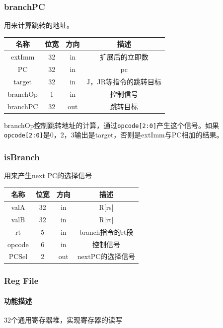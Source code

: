 \documentclass[UTF8]{ctexart}
\begin{document}
\subsubsection{branchPC }
用来计算跳转的地址。
\begin{table}[h]
    \centering
    \begin{tabular}{|c|c|c|c|}
        \hline  
        名称 & 位宽 & 方向 & 描述 \\ \hline 
        extImm & 32 & in & 扩展后的立即数 \\ \hline
        PC & 32 & in & pc \\ \hline 
        target & 32 & in & J，JR等指令的跳转目标 \\ \hline 
        branchOp & 1 & in & 控制信号 \\ \hline
        branchPC & 32 & out & 跳转目标\\ \hline
    \end{tabular}
\end{table}
branchOp控制跳转地址的计算，通过\texttt{opcode[2:0]}产生这个信号。如果
\texttt{opcode[2:0]}是0，2，3输出是target，否则是extImm与PC相加的结果。
\subsubsection{isBranch}
用来产生next PC的选择信号
\begin{table}[h]
    \centering
    \begin{tabular}{|c|c|c|c|}
        \hline  
        名称 & 位宽 & 方向 & 描述 \\ \hline 
        valA & 32 & in & R[rs] \\ \hline
        valB & 32 & in & R[rt] \\ \hline 
        rt & 5 & in & branch指令的rt段 \\ \hline 
        opcode & 6 & in & 控制信号 \\ \hline
        PCSel & 2 & out & nextPC的选择信号\\ \hline
    \end{tabular}
\end{table}
\subsubsection{Reg File}
\paragraph{功能描述}
32个通用寄存器堆，实现寄存器的读写
\end{document}
